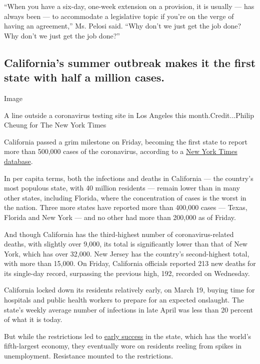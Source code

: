 ``When you have a six-day, one-week extension on a provision, it is
usually --- has always been --- to accommodate a legislative topic if
you're on the verge of having an agreement,'' Ms. Pelosi said. ``Why
don't we just get the job done? Why don't we just get the job done?''

\hypertarget{californias-summer-outbreak-makes-it-the-first-state-with-half-a-million-cases}{%
\subsection{California's summer outbreak makes it the first state with
half a million
cases.}\label{californias-summer-outbreak-makes-it-the-first-state-with-half-a-million-cases}}

Image

A line outside a coronavirus testing site in Los Angeles this
month.Credit...Philip Cheung for The New York Times

California passed a grim milestone on Friday, becoming the first state
to report more than 500,000 cases of the coronavirus, according to a
\href{https://www.nytimes.com/interactive/2020/us/coronavirus-us-cases.html\#states}{New
York Times database}.

In per capita terms, both the infections and deaths in California ---
the country's most populous state, with 40 million residents --- remain
lower than in many other states, including Florida, where the
concentration of cases is the worst in the nation. Three more states
have reported more than 400,000 cases --- Texas, Florida and New York
--- and no other had more than 200,000 as of Friday.

And though California has the third-highest number of
coronavirus-related deaths, with slightly over 9,000, its total is
significantly lower than that of New York, which has over 32,000. New
Jersey has the country's second-highest total, with more than 15,000. On
Friday, California officials reported 213 new deaths for its single-day
record, surpassing the previous high, 192, recorded on Wednesday.

California locked down its residents relatively early, on March 19,
buying time for hospitals and public health workers to prepare for an
expected onslaught. The state's weekly average number of infections in
late April was less than 20 percent of what it is today.

But while the restrictions led to
\href{https://www.nytimes.com/2020/04/14/us/california-coronavirus-shutdown.html}{early
success} in the state, which has the world's fifth-largest economy, they
eventually wore on residents reeling from spikes in unemployment.
Resistance mounted to the restrictions.

